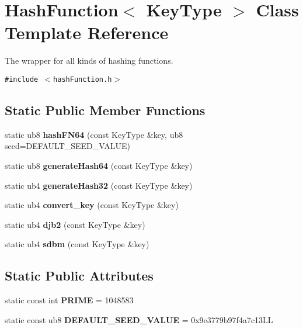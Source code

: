\hypertarget{classHashFunction}{
\section{HashFunction$<$ KeyType $>$ Class Template Reference}
\label{classHashFunction}
}
The wrapper for all kinds of hashing functions.  


{\tt \#include $<$hashFunction.h$>$}

\subsection*{Static Public Member Functions}
\begin{CompactItemize}
\item 
\hypertarget{classHashFunction_69a7f964113756f07da48c130896de7d}{
static ub8 \textbf{hashFN64} (const KeyType \&key, ub8 seed=DEFAULT\_\-SEED\_\-VALUE)}
\label{classHashFunction_69a7f964113756f07da48c130896de7d}

\item 
\hypertarget{classHashFunction_e082dc6a9b0efdf714a09e5ac3ab382f}{
static ub8 \textbf{generateHash64} (const KeyType \&key)}
\label{classHashFunction_e082dc6a9b0efdf714a09e5ac3ab382f}

\item 
\hypertarget{classHashFunction_f7aab699cf1b78dcfe3b176546db55c7}{
static ub4 \textbf{generateHash32} (const KeyType \&key)}
\label{classHashFunction_f7aab699cf1b78dcfe3b176546db55c7}

\item 
\hypertarget{classHashFunction_d5eb3f58ca701ad6434d5fe6bade5c4a}{
static ub4 \textbf{convert\_\-key} (const KeyType \&key)}
\label{classHashFunction_d5eb3f58ca701ad6434d5fe6bade5c4a}

\item 
\hypertarget{classHashFunction_2a4beede28570f97dbc73acce3c67ae6}{
static ub4 \textbf{djb2} (const KeyType \&key)}
\label{classHashFunction_2a4beede28570f97dbc73acce3c67ae6}

\item 
\hypertarget{classHashFunction_9c9a10aee49141a2bc5d373693eecc4c}{
static ub4 \textbf{sdbm} (const KeyType \&key)}
\label{classHashFunction_9c9a10aee49141a2bc5d373693eecc4c}

\end{CompactItemize}
\subsection*{Static Public Attributes}
\begin{CompactItemize}
\item 
\hypertarget{classHashFunction_e5a9723ac9cb838a4a04f8190249cd7b}{
static const int \textbf{PRIME} = 1048583}
\label{classHashFunction_e5a9723ac9cb838a4a04f8190249cd7b}

\item 
\hypertarget{classHashFunction_90a5fb5ed6ef8b7b93b6766f19f0d8ed}{
static const ub8 \textbf{DEFAULT\_\-SEED\_\-VALUE} = 0x9e3779b97f4a7c13LL}
\label{classHashFunction_90a5fb5ed6ef8b7b93b6766f19f0d8ed}

\end{CompactItemize}


